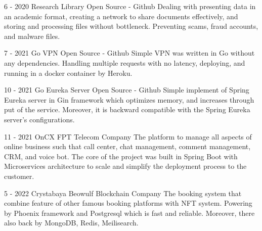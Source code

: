 \documentclass[10pt,A4]{article}
\begin{document}
\begin{paracol}{2}
\begin{rightcolumn}
{}
	
\cvevent
	{6 - 2020}
	{Research Library}
	{Open Source - Github}
	{Dealing with presenting data in an academic format, creating a network to share documents effectively, and storing and processing files without bottleneck. Preventing scams, fraud accounts, and malware files.}
	
\cvevent
	{7 - 2021}
	{Go VPN}
	{Open Source - Github}
	{Simple VPN was written in Go without any dependencies. Handling multiple requests with no latency, deploying, and running in a docker container by Heroku.}

\cvevent
	{10 - 2021}
	{Go Eureka Server}
	{Open Source - Github}
	{Simple implement of Spring Eureka server in Gin framework which optimizes memory, and increases through put of the service. Moreover, it is backward compatible with the Spring Eureka server's configurations.}
	
\cvevent
	{11 - 2021}
	{OnCX}
	{FPT Telecom Company}
	{The platform to manage all aspects of online business such that call center, chat management, comment management, CRM, and voice bot. The core of the project was built in Spring Boot with Microservices architecture to scale and simplify the deployment process to the customer.}
	
\cvevent
	{5 - 2022}
	{Crystabaya}
	{Beowulf Blockchain Company}
	{The booking system that combine feature of other famous booking platforms with NFT system. Powering by Phoenix framework and Postgresql which is fast and reliable. Moreover, there also back by MongoDB, Redis, Meilisearch.}

\end{rightcolumn}
\end{paracol}
\end{document}
